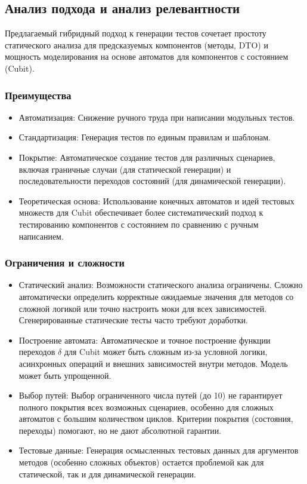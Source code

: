 \documentclass[14pt, russian]{scrartcl}
\begin{document}
\subsection{Анализ подхода и анализ релевантности}

Предлагаемый гибридный подход к генерации тестов сочетает простоту статического анализа для предсказуемых компонентов (методы, DTO) и мощность моделирования на основе автоматов для компонентов с состоянием (Cubit).

\subsubsection{Преимущества}

\begin{itemize}
    \item {Автоматизация:} Снижение ручного труда при написании модульных тестов.
    \item {Стандартизация:} Генерация тестов по единым правилам и шаблонам.
    \item {Покрытие:} Автоматическое создание тестов для различных сценариев, включая граничные случаи (для статической генерации) и последовательности переходов состояний (для динамической генерации).
    \item {Теоретическая основа:} Использование конечных автоматов и идей тестовых множеств для Cubit обеспечивает более систематический подход к тестированию компонентов с состоянием по сравнению с ручным написанием.
\end{itemize}

\subsubsection{Ограничения и сложности}

\begin{itemize}
    \item {Статический анализ:} Возможности статического анализа ограничены. Сложно автоматически определить корректные ожидаемые значения для методов со сложной логикой или точно настроить моки для всех зависимостей. Сгенерированные статические тесты часто требуют доработки.
    \item {Построение автомата:} Автоматическое и точное построение функции переходов $\delta$ для Cubit может быть сложным из-за условной логики, асинхронных операций и внешних зависимостей внутри методов. Модель может быть упрощенной.
    \item {Выбор путей:} Выбор ограниченного числа путей (до 10) не гарантирует полного покрытия всех возможных сценариев, особенно для сложных автоматов с большим количеством циклов. Критерии покрытия (состояния, переходы) помогают, но не дают абсолютной гарантии.
    \item {Тестовые данные:} Генерация осмысленных тестовых данных для аргументов методов (особенно сложных объектов) остается проблемой как для статической, так и для динамической генерации.
\end{itemize}
\end{document}
